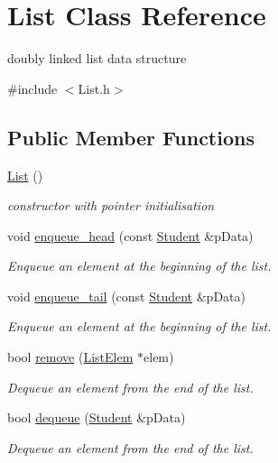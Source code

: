 \hypertarget{class_list}{}\section{List Class Reference}
\label{class_list}


doubly linked list data structure  




{\ttfamily \#include $<$List.\+h$>$}

\subsection*{Public Member Functions}
\begin{DoxyCompactItemize}
\item 
\mbox{\label{class_list_a64d878a92d11f7c63c70cbe4e7dd4176}} 
\hyperlink{class_list_a64d878a92d11f7c63c70cbe4e7dd4176}{List} ()
\begin{DoxyCompactList}\small\item\em constructor with pointer initialisation \end{DoxyCompactList}\item 
void \hyperlink{class_list_abe1c128f9a438009a7ebe1ff946963cf}{enqueue\+\_\+head} (const \hyperlink{class_student}{Student} \&p\+Data)
\begin{DoxyCompactList}\small\item\em Enqueue an element at the beginning of the list. \end{DoxyCompactList}\item 
void \hyperlink{class_list_a8d121a27df3b8984d0ac7edc87d14af5}{enqueue\+\_\+tail} (const \hyperlink{class_student}{Student} \&p\+Data)
\begin{DoxyCompactList}\small\item\em Enqueue an element at the beginning of the list. \end{DoxyCompactList}\item 
bool \hyperlink{class_list_a3cd4941e2836482d8155a2b61e0f3356}{remove} (\hyperlink{class_list_elem}{List\+Elem} $\ast$elem)
\begin{DoxyCompactList}\small\item\em Dequeue an element from the end of the list. \end{DoxyCompactList}\item 
bool \hyperlink{class_list_addc22172363ef656a20069489a1d003f}{dequeue} (\hyperlink{class_student}{Student} \&p\+Data)
\begin{DoxyCompactList}\small\item\em Dequeue an element from the end of the list. \end{DoxyCompactList}\item 

\end{DoxyCompactItemize}
